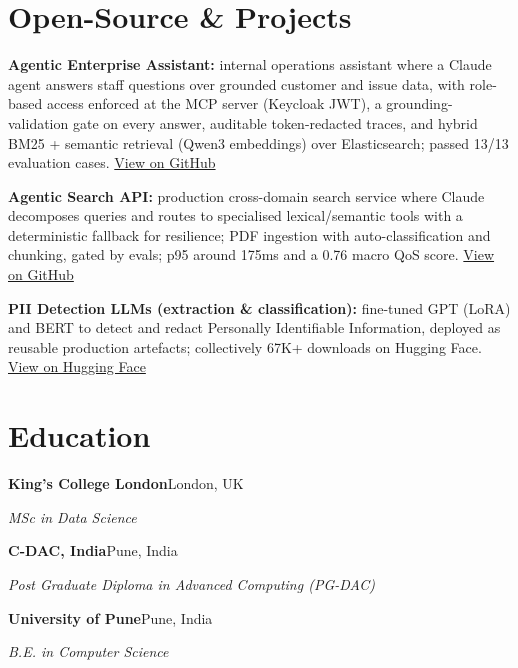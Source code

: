 \documentclass[10pt,a4paper]{article}
\begin{document}
\section{Open-Source \& Projects}
\begin{tight}
  \item \textbf{Agentic Enterprise Assistant:} internal operations assistant where a Claude agent answers staff questions over grounded customer and issue data, with role-based access enforced at the MCP server (Keycloak JWT), a grounding-validation gate on every answer, auditable token-redacted traces, and hybrid BM25 + semantic retrieval (Qwen3 embeddings) over Elasticsearch; passed 13/13 evaluation cases. \href{https://github.com/abhijeetscode/Agentic-Enterprise-Assistant}{View on GitHub}
  \item \textbf{Agentic Search API:} production cross-domain search service where Claude decomposes queries and routes to specialised lexical/semantic tools with a deterministic fallback for resilience; PDF ingestion with auto-classification and chunking, gated by evals; p95 around 175ms and a 0.76 macro QoS score. \href{https://github.com/abhijeetscode/search-agent}{View on GitHub}
  \item \textbf{PII Detection LLMs (extraction \& classification):} fine-tuned GPT (LoRA) and BERT to detect and redact Personally Identifiable Information, deployed as reusable production artefacts; collectively 67K+ downloads on Hugging Face. \href{https://huggingface.co/ab-ai/pii_model}{View on Hugging Face}
\end{tight}

\section{Education}
{\color{company}\bfseries King's College London}\hfill {\color{muted}London, UK}\par
{\itshape MSc in Data Science}\par\vspace{2pt}
{\color{company}\bfseries C-DAC, India}\hfill {\color{muted}Pune, India}\par
{\itshape Post Graduate Diploma in Advanced Computing (PG-DAC)}\par\vspace{2pt}
{\color{company}\bfseries University of Pune}\hfill {\color{muted}Pune, India}\par
{\itshape B.E. in Computer Science}\par
\end{document}
